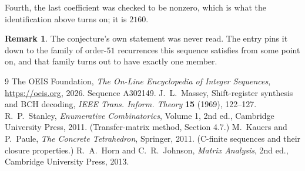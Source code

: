 \documentclass[11pt,a4paper]{article}
\theoremstyle{plain}
\theoremstyle{definition}
\newtheorem{remark}[theorem]{Remark}
\begin{document}
Fourth, the last coefficient was checked to be nonzero, which is what the identification above
turns on; it is $2160$.

\begin{remark}
The conjecture's own statement was never read. The entry pins it down to the family of
order-$51$ recurrences this sequence satisfies from some point on, and that family turns
out to have exactly one member.
\end{remark}

\begin{thebibliography}{9}
 The OEIS Foundation, \emph{The On-Line Encyclopedia of Integer
Sequences}, \url{https://oeis.org}, 2026. Sequence A302149.
 J.~L.~Massey, Shift-register synthesis and BCH decoding, \emph{IEEE
Trans. Inform. Theory} \textbf{15} (1969), 122--127.
 R.~P.~Stanley, \emph{Enumerative Combinatorics}, Volume 1, 2nd ed.,
Cambridge University Press, 2011. (Transfer-matrix method, Section 4.7.)
 M.~Kauers and P.~Paule, \emph{The Concrete Tetrahedron}, Springer, 2011.
(C-finite sequences and their closure properties.)
 R.~A.~Horn and C.~R.~Johnson, \emph{Matrix Analysis}, 2nd ed., Cambridge
University Press, 2013.
\end{thebibliography}
\end{document}
